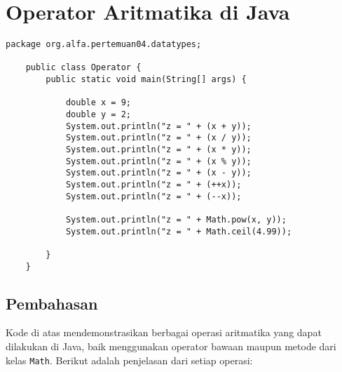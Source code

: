 \section{Operator Aritmatika di Java}

\begin{lstlisting}[style=JavaStyle, caption={Java Code for Arithmetic Operations}]
	package org.alfa.pertemuan04.datatypes;
	
	public class Operator {
		public static void main(String[] args) {
			
			double x = 9;
			double y = 2;
			System.out.println("z = " + (x + y));
			System.out.println("z = " + (x / y));
			System.out.println("z = " + (x * y));
			System.out.println("z = " + (x % y));
			System.out.println("z = " + (x - y));
			System.out.println("z = " + (++x));
			System.out.println("z = " + (--x));
			
			System.out.println("z = " + Math.pow(x, y));    
			System.out.println("z = " + Math.ceil(4.99));    
			
		}
	}
\end{lstlisting}

\subsection{Pembahasan}
Kode di atas mendemonstrasikan berbagai operasi aritmatika yang dapat dilakukan di Java, baik menggunakan operator bawaan maupun metode dari kelas \texttt{Math}. Berikut adalah penjelasan dari setiap operasi:

